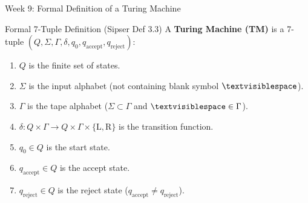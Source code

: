 \documentclass[aspectratio=169,10pt]{beamer}
\begin{document}
\begin{frame}{Week 9: Formal Definition of a Turing Machine}
    \begin{block}{Formal 7-Tuple Definition (Sipser Def 3.3)}
        A \textbf{Turing Machine (TM)} is a 7-tuple $(Q, \Sigma, \Gamma, \delta, q_0, q_{\text{accept}}, q_{\text{reject}})$:
        \begin{enumerate}
            \item $Q$ is the finite set of states.
            \item $\Sigma$ is the input alphabet (not containing blank symbol $\textvisiblespace$).
            \item $\Gamma$ is the tape alphabet ($\Sigma \subset \Gamma$ and $\textvisiblespace \in \Gamma$).
            \item $\delta: Q \times \Gamma \to Q \times \Gamma \times \{\text{L}, \text{R}\}$ is the transition function.
            \item $q_0 \in Q$ is the start state.
            \item $q_{\text{accept}} \in Q$ is the accept state.
            \item $q_{\text{reject}} \in Q$ is the reject state ($q_{\text{accept}} \neq q_{\text{reject}}$).
        \end{enumerate}
    \end{block}
    
    \begin{center}
    \end{center}
\end{frame}
\end{document}
